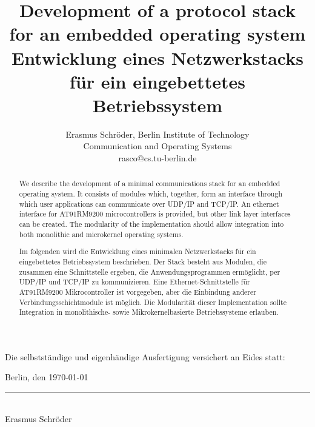 \documentclass[11pt,twoside,abstract,notitlepage]{scrreprt}
\begin{document}
\title{Development of a protocol stack for an embedded operating system\break
Entwicklung eines Netzwerkstacks für ein eingebettetes Betriebssystem}
\author{Erasmus Schröder, Berlin Institute of Technology\\
    Communication and Operating Systems\\
    rasco@cs.tu-berlin.de}
\maketitle



\vfill
\vfill
\vfill
\begin{center}\begin{minipage}{0.89\textwidth}

Die selbstständige und eigenhändige Ausfertigung versichert an Eides
statt:

\bigskip{}
\bigskip{}
\bigskip{}
Berlin, den \today \\ \vspace{2cm} \hfill \parbox{6cm}{\centering \rule{6cm}{1pt} \\ Erasmus Schröder}
\end{minipage}\end{center}\vspace*{-5cm}
\newpage
\begin{abstract}
We describe the development of a minimal communications stack for an embedded operating system. It consists of modules which, together, form an interface through which user applications can communicate over UDP/IP and TCP/IP. An ethernet interface for AT91RM9200 microcontrollers is provided, but other link layer interfaces can be created. The modularity of the implementation should allow integration into both monolithic and microkernel operating systems.
\end{abstract}

\renewcommand{\abstractname}{Zusammenfassung}

\begin{abstract}
Im folgenden wird die Entwicklung eines minimalen Netzwerkstacks für ein eingebettetes Betriebssystem beschrieben. Der Stack besteht aus Modulen, die zusammen eine Schnittstelle ergeben, die Anwendungsprogrammen ermöglicht, per UDP/IP und TCP/IP zu kommunizieren. Eine Ethernet-Schnittstelle für AT91RM9200 Mikrocontroller ist vorgegeben, aber die Einbindung anderer Verbindungsschichtmodule ist möglich. Die Modularität dieser Implementation sollte Integration in monolithische- sowie Mikrokernelbasierte Betriebssysteme erlauben.\end{abstract}
\newpage
\setcounter{tocdepth}{3}
\tableofcontents
\end{document}
